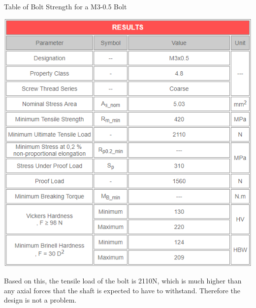 \documentclass[../main.tex]{subfiles}
\begin{document}
\begin{table}[H]
	\centering
	\caption{Table of Bolt Strength for a M3-0.5 Bolt \cite{BOLTSTRENGTH}}
	\includegraphics[width=\linewidth]{img/servo/boltProperties.PNG}
	\label{tbl:boltStrength}
\end{table}

Based on this, the tensile load of the bolt is 2110N, which is much higher than any axial forces that the shaft is expected to have to withstand. Therefore the design is not a problem.
\end{document}
